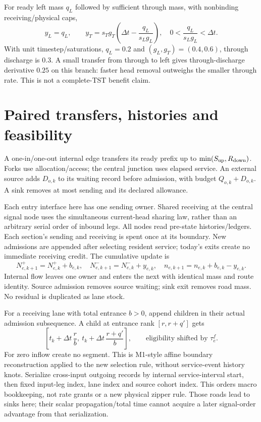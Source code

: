 \documentclass[10pt,a4paper]{article}
\begin{document}
For ready left mass $q_L$ followed by sufficient through mass, with
nonbinding receiving/physical caps,
\begin{equation}
 y_L=q_L,\qquad
 y_T=s_Tg_T\left(\Delta t-\frac{q_L}{s_Lg_L}\right),
 \quad 0<\frac{q_L}{s_Lg_L}<\Delta t.
 \label{eq:head-example}
\end{equation}
With unit timestep/saturations, $q_L=0.2$ and $(g_L,g_T)=(0.4,0.6)$,
through discharge is $0.3$. A small transfer from through to left gives
through-discharge derivative $0.25$ on this branch: faster head removal
outweighs the smaller through rate. This is not a complete-TST benefit claim.

\section{Paired transfers, histories and feasibility}

A one-in/one-out internal edge transfers its ready prefix up to
$\min(S_{\rm up},R_{\rm down})$. Forks use allocation/access; the central
junction uses elapsed service. An external source adds $D_{o,k}$ to its
waiting record before admission, with budget $Q_{o,k}+D_{o,k}$.
A sink removes at most sending and its declared allowance.

Each entry interface here has one sending owner. Shared receiving at the
central signal node uses the simultaneous current-head sharing law, rather
than an arbitrary serial order of inbound legs.
All nodes read pre-state histories/ledgers. Each section's sending and
receiving is spent once at its boundary. New admissions are appended
after selecting resident service; today's exits create no immediate
receiving credit. The cumulative update is
\begin{equation}
 N^+_{e,k+1}=N^+_{e,k}+b_{e,k},\quad
 N^-_{e,k+1}=N^-_{e,k}+y_{e,k},\quad
 n_{e,k+1}=n_{e,k}+b_{e,k}-y_{e,k}.
 \label{eq:state-update}
\end{equation}
Internal flow leaves one owner and enters the next with identical mass
and route identity. Source admission removes source waiting; sink exit
removes road mass. No residual is duplicated as lane stock.

For a receiving lane with total entrance $b>0$, append children in their
actual admission subsequence. A child at entrance rank $[r,r+q']$ gets
\begin{equation}
 \left[t_k+\Delta t\,\frac r b,\
       t_k+\Delta t\,\frac{r+q'}b\right],
 \qquad\text{eligibility shifted by }\tau^f_e .
 \label{eq:entry-time}
\end{equation}
For zero inflow create no segment. This is M1-style affine boundary
reconstruction applied to the new selection rule, without service-event
history knots. Serialize cross-input outgoing records by internal
service-interval start, then fixed input-leg index, lane index and source
cohort index. This orders macro bookkeeping, not rate grants or a new
physical zipper rule. Those roads lead to sinks here; their scalar
propagation/total time cannot acquire a later signal-order advantage
from that serialization.
\end{document}

